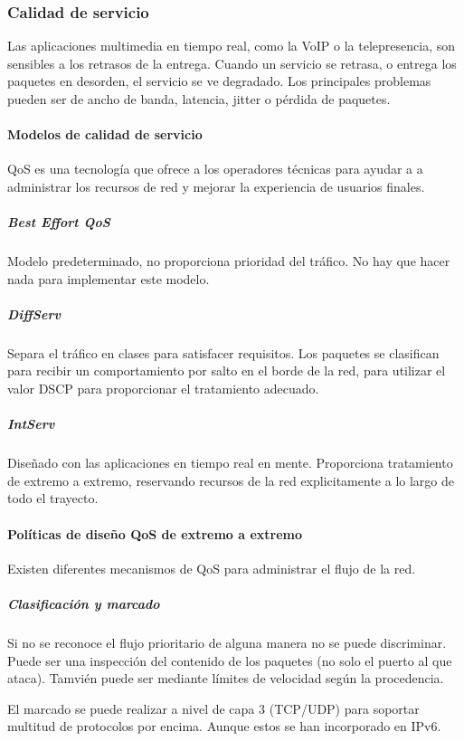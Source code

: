     \subsubsection{Calidad de servicio} %
        Las aplicaciones multimedia en tiempo real, como la VoIP o la telepresencia, son sensibles a los retrasos de la entrega. Cuando un servicio se retrasa, o entrega los paquetes en desorden, el servicio se ve degradado. Los principales problemas pueden ser de ancho de banda, latencia, jitter o pérdida de paquetes.
        
        \paragraph{Modelos de calidad de servicio} %
            QoS es una tecnología que ofrece a los operadores técnicas para ayudar a a administrar los recursos de red y mejorar la experiencia de usuarios finales.

            \subparagraph{Best Effort QoS} %
                Modelo predeterminado, no proporciona prioridad del tráfico. No hay que hacer nada para implementar este modelo.

            \subparagraph{DiffServ} %
                Separa el tráfico en clases para satisfacer requisitos. Los paquetes se clasifican para recibir un comportamiento por salto en el borde de la red, para utilizar el valor DSCP para proporcionar el tratamiento adecuado. 

            \subparagraph{IntServ} %
                Diseñado con las aplicaciones en tiempo real en mente. Proporciona tratamiento de extremo a extremo, reservando recursos de la red explicitamente a lo largo de todo el trayecto.

        \paragraph{Políticas de diseño QoS de extremo a extremo} %
            Existen diferentes mecanismos de QoS para administrar el flujo de la red.
            \subparagraph{Clasificación y marcado} %
                Si no se reconoce el flujo prioritario de alguna manera no se puede discriminar. Puede ser una inspección del contenido de los paquetes (no solo el puerto al que ataca). Tamvién puede ser mediante límites de velocidad según la procedencia.

                El marcado se puede realizar a nivel de capa 3 (TCP/UDP) para soportar multitud de protocolos por encima. Aunque estos se han incorporado en IPv6.

